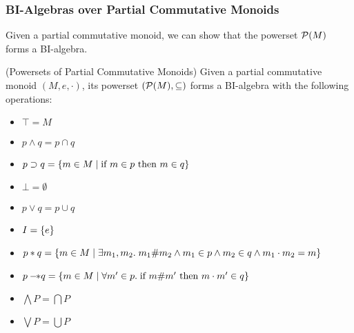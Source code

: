 \subsubsection{BI-Algebras over Partial Commutative Monoids}

Given a partial commutative monoid, we can show that the powerset $\mathcal{P}(M)$ 
forms a BI-algebra. 

\begin{lemma}{(Powersets of Partial Commutative Monoids)}
Given a partial commutative monoid $(M, e, \cdot)$, its powerset
$(\mathcal{P}(M), \subseteq)$ forms a BI-algebra
with the following operations:

\begin{itemize}
\item $\top = M$
\item $p \land q = p \cap q$
\item $p \supset q = \{{m \in M \;|\;\mbox{if }m \in p \mbox{ then } m \in q}\}$
\item $\bot = \emptyset$ 
\item $p \vee q = p \cup q$
\item $I = \{{e}\}$
\item $p * q = \{{m \in M\;|\; \exists m_1, m_2.\; 
                       m_1 \# m_2 \land m_1 \in p \land m_2 \in q \land m_1\cdot m_2 = m}\}$
\item $p -\!\!* q = \{ m \in M \;|\; \forall m' \in p.\; \mbox{if } m \# m' \mbox{ then } m \cdot m' \in q \}$
\item $\bigwedge P = \bigcap P$ 
\item $\bigvee P = \bigcup P$
\end{itemize}
\end{lemma}


